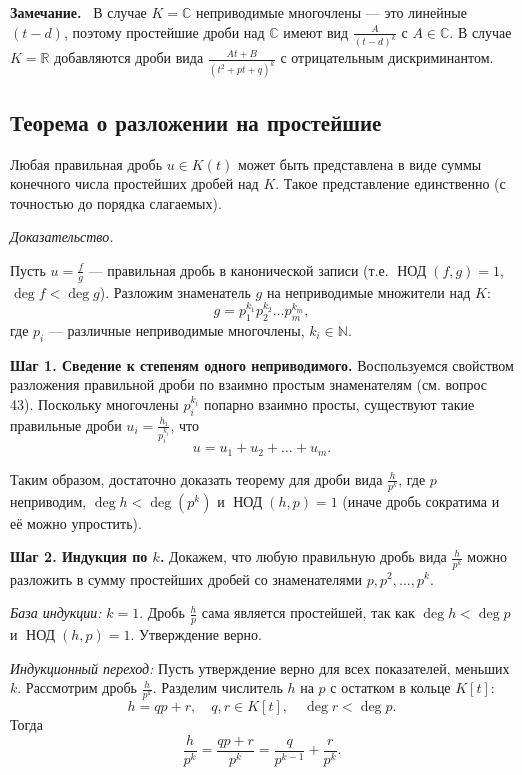 \documentclass[a4paper,12pt]{article}
\newcommand{\myremark}{\textbf{Замечание.}\ }
\theoremstyle{definition}
\theoremstyle{plain}
\theoremstyle{remark}
\begin{document}
	\myremark
	В случае \( K = \mathbb{C} \) неприводимые многочлены — это линейные \( (t - d) \), поэтому простейшие дроби над \( \mathbb{C} \) имеют вид \( \frac{A}{(t - d)^k} \) с \( A \in \mathbb{C} \). В случае \( K = \mathbb{R} \) добавляются дроби вида \( \frac{At + B}{(t^2 + pt + q)^k} \) с отрицательным дискриминантом.
	
	\subsection{Теорема о разложении на простейшие}
	
	\begin{tcolorbox}[colback=green!5, colframe=green!50!black, title=Теорема]
		Любая правильная дробь \( u \in K(t) \) может быть представлена в виде суммы конечного числа простейших дробей над \( K \). Такое представление единственно (с точностью до порядка слагаемых).
	\end{tcolorbox}
	
	\medskip
	\textit{Доказательство.}
	
	Пусть \( u = \frac{f}{g} \) — правильная дробь в канонической записи (т.е. \( \operatorname{НОД}(f, g) = 1 \), \( \deg f < \deg g \)). Разложим знаменатель \( g \) на неприводимые множители над \( K \):
	\[
	g = p_1^{k_1} p_2^{k_2} \dots p_m^{k_m},
	\]
	где \( p_i \) — различные неприводимые многочлены, \( k_i \in \mathbb{N} \).
	
	\textbf{Шаг 1. Сведение к степеням одного неприводимого.}
	Воспользуемся свойством разложения правильной дроби по взаимно простым знаменателям (см. вопрос 43). Поскольку многочлены \( p_i^{k_i} \) попарно взаимно просты, существуют такие правильные дроби \( u_i = \frac{h_i}{p_i^{k_i}} \), что
	\[
	u = u_1 + u_2 + \dots + u_m.
	\]
	
	Таким образом, достаточно доказать теорему для дроби вида \( \frac{h}{p^k} \), где \( p \) неприводим, \( \deg h < \deg(p^k) \) и \( \operatorname{НОД}(h, p) = 1 \) (иначе дробь сократима и её можно упростить).
	
	\textbf{Шаг 2. Индукция по \( k \).}
	Докажем, что любую правильную дробь вида \( \frac{h}{p^k} \) можно разложить в сумму простейших дробей со знаменателями \( p, p^2, \dots, p^k \).
	
	\textit{База индукции:} \( k = 1 \). Дробь \( \frac{h}{p} \) сама является простейшей, так как \( \deg h < \deg p \) и \( \operatorname{НОД}(h, p) = 1 \). Утверждение верно.
	
	\textit{Индукционный переход:} Пусть утверждение верно для всех показателей, меньших \( k \). Рассмотрим дробь \( \frac{h}{p^k} \). Разделим числитель \( h \) на \( p \) с остатком в кольце \( K[t] \):
	\[
	h = q p + r, \quad q, r \in K[t], \quad \deg r < \deg p.
	\]
	Тогда
	\[
	\frac{h}{p^k} = \frac{q p + r}{p^k} = \frac{q}{p^{k-1}} + \frac{r}{p^k}.
	\]
	
\end{document}
